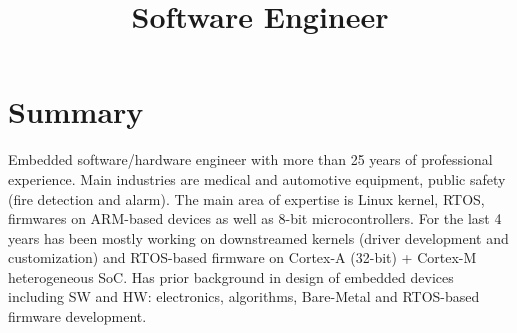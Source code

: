 \documentclass[11pt,a4paper]{moderncv}
\title{Software Engineer}
\begin{document}
\renewcommand*{\bibliographyhead}[1]{}

\maketitle

\section{Summary}
Embedded software/hardware engineer with more than 25 years of professional experience.
Main industries are medical and automotive equipment, public safety (fire detection and alarm).
The main area of expertise is Linux kernel, RTOS, firmwares on ARM-based devices
as well as 8-bit microcontrollers.
For the last 4 years has been mostly working on downstreamed kernels (driver development and customization) and
RTOS-based firmware on Cortex-A (32-bit) + Cortex-M heterogeneous SoC.
Has prior background in design of embedded devices including SW and HW: electronics, algorithms,
Bare-Metal and RTOS-based firmware development.
\end{document}
